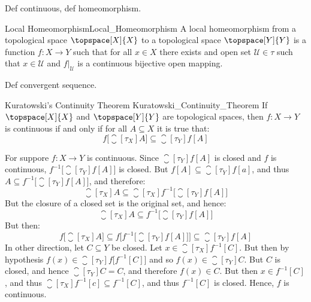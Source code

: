 \documentclass{article}                                                        %
\begin{document}
        Def continuous, def homeomorphism.
        \begin{fdefinition}{Local Homeomorphism}{Local_Homeomorphism}
            A local homeomorphism from a topological space $\topspace[X]{X}$ to
            a topological space $\topspace[Y]{Y}$ is a function
            $f:X\rightarrow{Y}$ such that for all $x\in{X}$ there exists and
            open set $\mathcal{U}\in\tau$ such that $x\in\mathcal{U}$ and
            $f|_{\mathcal{U}}$ is a continuous bijective open mapping.
        \end{fdefinition}
        Def convergent sequence.
        \begin{ftheorem}{Kuratowski's Continuity Theorem}
                        {Kuratowski_Continuity_Theorem}
            If $\topspace[X]{X}$ and $\topspace[Y]{Y}$ are topological spaces,
            then $f:X\rightarrow{Y}$ is continuous if and only if for all
            $A\subseteq{X}$ it is true that:
            \begin{equation*}
                f\big[\closure[\tau_{X}]{A}\big]\subseteq
                \closure[\tau_{Y}]{f[A]}
            \end{equation*}
        \end{ftheorem}
        \begin{bproof}
            For suppore $f:X\rightarrow{Y}$ is continuous. Since
            $\closure[\tau_{Y}]{f[A]}$ is closed and $f$ is continuous,
            $f^{\minus{1}}\big[\closure[\tau_{Y}]{f[A]}\big]$ is closed.
            But $f[A]\subseteq\closure[\tau_{Y}]{f[a]}$, and thus
            $A\subseteq{f}^{\minus{1}}\big[\closure[\tau_{Y}]{f[A]}\big]$,
            and therefore:
            \begin{equation}
                \closure[\tau_{X}]{A}\subseteq
                \closure[\tau_{X}]
                    {{f}^{\minus{1}}\big[\closure[\tau_{Y}]{f[A]}\big]}
            \end{equation}
            But the closure of a closed set is the original set, and hence:
            \begin{equation}
                \closure[\tau_{X}]{A}\subseteq
                    f^{\minus{1}}\big[\closure[\tau_{Y}]{f[A]}\big]
            \end{equation}
            But then:
            \begin{equation}
                f\big[\closure[\tau_{X}]{A}\big]\subseteq
                f\Big[f^{\minus{1}}\big[\closure[\tau_{Y}]{f[A]}\big]\Big]
                \subseteq\closure[\tau_{Y}]{f[A]}
            \end{equation}
            In other direction, let $C\subseteq{Y}$ be closed. Let
            $x\in\closure[\tau_{X}]{f^{\minus{1}}[C]}$. But then by hypothesis
            $f(x)\in\closure[\tau_{Y}]{f\big[f^{\minus{1}}[C]\big]}$ and so
            $f(x)\in\closure[\tau_{Y}]{C}$. But $C$ is closed, and hence
            $\closure[\tau_{Y}]{C}=C$, and therefore $f(x)\in{C}$. But then
            $x\in{f}^{\minus{1}}[C]$, and thus
            $\closure[\tau_{X}]{f^{\minus{1}}[c]}\subseteq{f}^{\minus{1}}[C]$,
            and thus $f^{\minus{1}}[C]$ is closed. Hence, $f$ is continuous.
        \end{bproof}
\end{document}
